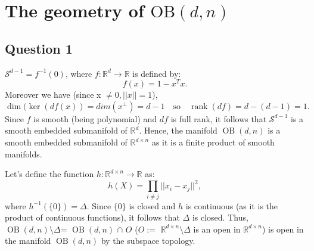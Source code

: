 \documentclass{article}
\date{\today}
\begin{document}
\hypersetup{pageanchor=false} 


\clearpage
\thispagestyle{empty}
\tableofcontents

\clearpage
\hypersetup{pageanchor=true} %
\setcounter{page}{1}








\section*{The geometry of $\text{OB}(d, n)$}

\subsection*{Question 1}
$\mathcal{S}^{d-1} = f^{-1}(0)$, where $f: \mathbb{R}^d \to \mathbb{R}$ is defined by:
\[
    f(x) = 1 - x^T x.
\]
Moreover we have (since x $\neq0, ||x||=1$),
\[
\dim (\ker (df(x)) = dim (x^\perp)= d - 1 \quad \text{so} \quad \operatorname{rank} (df) = d - (d - 1) = 1.
\]
Since $f$ is smooth (being polynomial) and $df$ is full rank, it follows that $\mathcal{S}^{d-1}$ is a smooth embedded submanifold of $\mathbb{R}^d$. Hence, the manifold $\operatorname{OB}(d,n)$ is a smooth embedded submanifold of $\mathbb{R}^{d\times n}$ as it is a finite product of smooth manifolds.

Let's define the function $h: \mathbb{R}^{d \times n} \to \mathbb{R}$ as:
\[
    h(X) = \prod_{i \neq j} ||x_i - x_j||^2,
\]
where $h^{-1}(\{0\}) = \Delta$. Since $\{0\}$ is closed and $h$ is continuous (as it is the product of continuous functions), it follows that $\Delta$ is closed. Thus, $\operatorname{OB}(d,n) \setminus \Delta$= $\operatorname{OB}(d,n)$ $\cap$ $O$ ($O :=$ $\mathbb{R}^{d\times n} \setminus \Delta$ is an open in $\mathbb{R}^{d\times n}$)  is open in the manifold $\operatorname{OB}(d,n)$ by the subspace topology.
    
\end{document}
